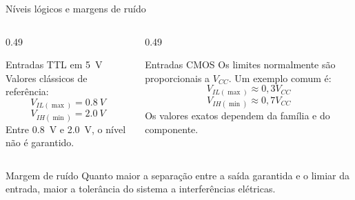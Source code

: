 
\begin{frame}{Níveis lógicos e margens de ruído}
    \begin{columns}[T]
        \begin{column}{0.49\textwidth}
            \begin{block}{Entradas TTL em 5~V}
                Valores clássicos de referência:
                \[
                    V_{IL(\max)}=0.8~V
                \]
                \[
                    V_{IH(\min)}=2.0~V
                \]
                Entre 0.8~V e 2.0~V, o nível não é garantido.
            \end{block}
        \end{column}
        \begin{column}{0.49\textwidth}
            \begin{block}{Entradas CMOS}
                Os limites normalmente são proporcionais a $V_{CC}$.
                Um exemplo comum é:
                \[
                    V_{IL(\max)}\approx 0{,}3V_{CC}
                \]
                \[
                    V_{IH(\min)}\approx 0{,}7V_{CC}
                \]
                Os valores exatos dependem da família e do componente.
            \end{block}
        \end{column}
    \end{columns}

    \begin{alertblock}{Margem de ruído}
        Quanto maior a separação entre a saída garantida e o limiar da entrada,
        maior a tolerância do sistema a interferências elétricas.
    \end{alertblock}
\end{frame}
